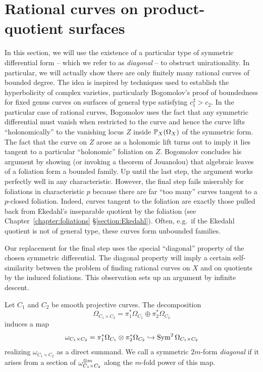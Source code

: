 \documentclass[main.tex]{subfiles}
\begin{document}
\section{Rational curves on product-quotient surfaces} \label{sec:obstruction}

In this section, we will use the existence of a particular type of symmetric differential form -- which we refer to as \textit{diagonal} -- to obstruct unirationality. In particular, we will actually show there are only finitely many rational curves of bounded degree. The idea is inspired by techniques used to establish the hyperbolicity of complex varieties, particularly Bogomolov's proof of boundedness for fixed genus curves on surfaces of general type satisfying $c_1^2 > c_2$. In the particular case of rational curves, Bogomolov uses the fact that any symmetric differential must vanish when restricted to the curve and hence the curve lifts ``holonomically'' to the vanishing locus $Z$ inside $\P_X(\Omega_X)$ of the symmetric form. The fact that the curve on $Z$ arose as a holonomic lift turns out to imply it lies tangent to a particular ``holonomic'' foliation on $Z$. Bogomolov concludes his argument by showing (or invoking a theorem of Jouanolou) that algebraic leaves of a foliation form a bounded family. Up until the last step, the argument works perfectly well in any characteristic. However, the final step fails miserably for foliations in characteristic $p$ because there are far ``too many'' curves tangent to a $p$-closed foliation. Indeed, curves tangent to the foliation are exactly those pulled back from Ekedahl's inseparable quotient by the foliation (see Chapter~\ref{chapter:foliations} \S\ref{section:Ekedahl}). Often, e.g.\ if the Ekedahl quotient is not of general type, these curves form unbounded families. 
\par 
Our replacement for the final step uses the special ``diagonal'' property of the chosen symmetric differential. The diagonal property will imply a certain self-similarity between the problem of finding rational curves on $X$ and on quotients by the induced foliations. This observation sets up an argument by infinite descent. 

\begin{defn} \label{def:diagonal}
Let $C_1$ and $C_2$ be smooth projective curves. The decomposition
\[ \Omega_{C_1 \times C_2} = \pi_1^* \Omega_{C_1} \oplus \pi_2^* \Omega_{C_2} \]
induces a map
\[ \omega_{C_1 \times C_2} = \pi_1^* \Omega_{C_1} \ot \pi_2^* \Omega_{C_2} \embed \Sym^{2}{\Omega_{C_1 \times C_2}} \]
realizing $\omega_{C_1 \times C_2}$ as a direct summand. We call a symmetric $2m$-form \textit{diagonal} if it arises from a section of $\omega_{C_1 \times C_2}^{\ot m}$ along the $m$-fold power of this map.
\end{defn}
\end{document}
